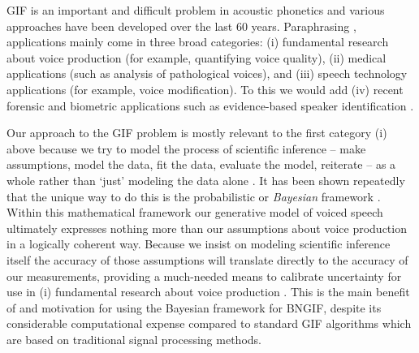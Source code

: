 \begin{chaptersections}

GIF is an important and difficult problem in acoustic phonetics \citep{Auvinen2014,Kadiri2021} and various approaches have been developed over the last 60 years.
Paraphrasing \cite{Alku2011}, applications mainly come in three broad categories: (i) fundamental research about voice production (for example, quantifying voice quality), (ii) medical applications (such as analysis of pathological voices), and (iii) speech technology applications (for example, voice modification).
To this we would add (iv) recent forensic and biometric applications such as evidence-based speaker identification \citep{Bonastre2015}.

Our approach to the GIF problem is mostly relevant to the first category (i) above because we try to model the process of scientific inference -- make assumptions, model the data, fit the data, evaluate the model, reiterate -- as a whole rather than `just' modeling the data alone \citep[Ch.~28]{MacKay2005}.
It has been shown repeatedly that the unique way to do this is the probabilistic or \emph{Bayesian} framework \citep{Knuth2012}.
Within this mathematical framework our generative model of voiced speech ultimately expresses nothing more than our assumptions about voice production in a logically coherent way.
Because we insist on modeling scientific inference itself the accuracy of those assumptions will translate directly to the accuracy of our measurements, providing a much-needed means to calibrate uncertainty for use in (i) fundamental research about voice production \citep{Kent2018}.
This is the main benefit of and motivation for using the Bayesian framework for BNGIF, despite its considerable computational expense compared to standard GIF algorithms which are based on traditional signal processing methods.


\end{chaptersections}
